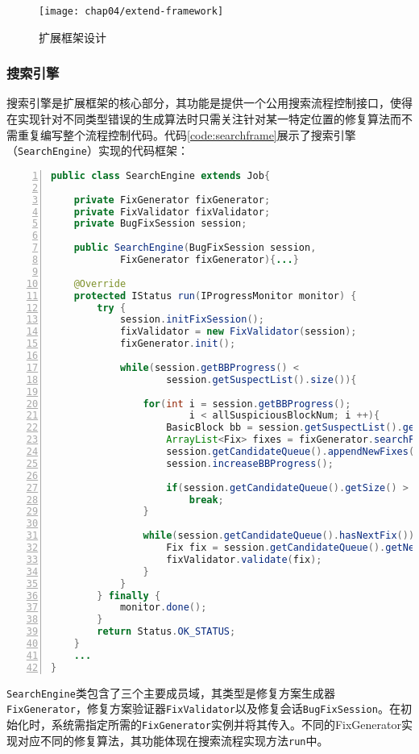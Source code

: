 \begin{figure}
	\centering
	\texttt{[image: chap04/extend-framework]}
	\caption{扩展框架设计}
	\label{fig:extend-framework}
\end{figure}


\subsubsection{搜索引擎}

搜索引擎是扩展框架的核心部分，其功能是提供一个公用搜索流程控制接口，使得在实现针对不同类型错误的生成算法时只需关注针对某一特定位置的修复算法而不需重复编写整个流程控制代码。代码\ref{code:searchframe}展示了搜索引擎（\texttt{SearchEngine}）实现的代码框架：


\begin{lstlisting}[caption=搜索框架,frame=single,language=Java,numbers=left,basicstyle=\ttfamily\footnotesize,label={code:searchframe},tabsize=2]
public class SearchEngine extends Job{

	private FixGenerator fixGenerator;
	private FixValidator fixValidator;
	private BugFixSession session;

	public SearchEngine(BugFixSession session, 
			FixGenerator fixGenerator){...}
	
	@Override
	protected IStatus run(IProgressMonitor monitor) {
		try {
			session.initFixSession();
			fixValidator = new FixValidator(session);
			fixGenerator.init();

			while(session.getBBProgress() < 
					session.getSuspectList().size()){
				
				for(int i = session.getBBProgress(); 
						i < allSuspiciousBlockNum; i ++){
					BasicBlock bb = session.getSuspectList().get(i);
					ArrayList<Fix> fixes = fixGenerator.searchFixes(bb);
					session.getCandidateQueue().appendNewFixes(fixes);
					session.increaseBBProgress();
					
					if(session.getCandidateQueue().getSize() > 30)
						break;
				}
								
				while(session.getCandidateQueue().hasNextFix()){
					Fix fix = session.getCandidateQueue().getNextFix();
					fixValidator.validate(fix);
				}
			}			
		} finally {
			monitor.done();
		}		
		return Status.OK_STATUS;
	}
	...
}
\end{lstlisting}

\texttt{SearchEngine}类包含了三个主要成员域，其类型是修复方案生成器\texttt{FixGenerator}，修复方案验证器\texttt{FixValidator}以及修复会话\texttt{BugFixSession}。在初始化时，系统需指定所需的\texttt{FixGenerator}实例并将其传入。不同的FixGenerator实现对应不同的修复算法，其功能体现在搜索流程实现方法\texttt{run}中。

